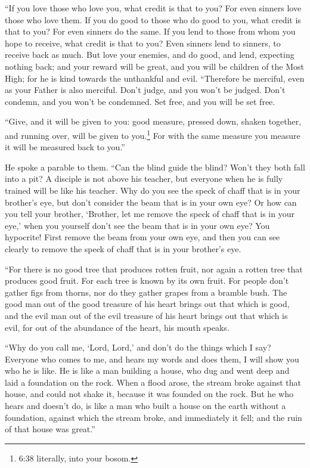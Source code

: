  ``If you love those who love you, what credit is that to
you? For even sinners love those who love them.  If you do
good to those who do good to you, what credit is that to you? For even
sinners do the same.  If you lend to those from whom you
hope to receive, what credit is that to you? Even sinners lend to
sinners, to receive back as much.  But love your enemies,
and do good, and lend, expecting nothing back; and your reward will be
great, and you will be children of the Most High; for he is kind towards
the unthankful and evil.  ``Therefore be merciful, even as
your Father is also merciful.  Don't judge, and you won't
be judged. Don't condemn, and you won't be condemned. Set free, and you
will be set free.

 ``Give, and it will be given to you: good measure, pressed
down, shaken together, and running over, will be given to
you.\footnote{6:38 literally, into your bosom.} For with the same
measure you measure it will be measured back to you.''

 He spoke a parable to them. ``Can the blind guide the
blind? Won't they both fall into a pit?  A disciple is not
above his teacher, but everyone when he is fully trained will be like
his teacher.  Why do you see the speck of chaff that is in
your brother's eye, but don't consider the beam that is in your own eye?
 Or how can you tell your brother, `Brother, let me remove
the speck of chaff that is in your eye,' when you yourself don't see the
beam that is in your own eye? You hypocrite! First remove the beam from
your own eye, and then you can see clearly to remove the speck of chaff
that is in your brother's eye.

 ``For there is no good tree that produces rotten fruit,
nor again a rotten tree that produces good fruit.  For each
tree is known by its own fruit. For people don't gather figs from
thorns, nor do they gather grapes from a bramble bush.  The
good man out of the good treasure of his heart brings out that which is
good, and the evil man out of the evil treasure of his heart brings out
that which is evil, for out of the abundance of the heart, his mouth
speaks.

 ``Why do you call me, `Lord, Lord,' and don't do the
things which I say?  Everyone who comes to me, and hears my
words and does them, I will show you who he is like.  He is
like a man building a house, who dug and went deep and laid a foundation
on the rock. When a flood arose, the stream broke against that house,
and could not shake it, because it was founded on the rock.
 But he who hears and doesn't do, is like a man who built a
house on the earth without a foundation, against which the stream broke,
and immediately it fell; and the ruin of that house was great.''

